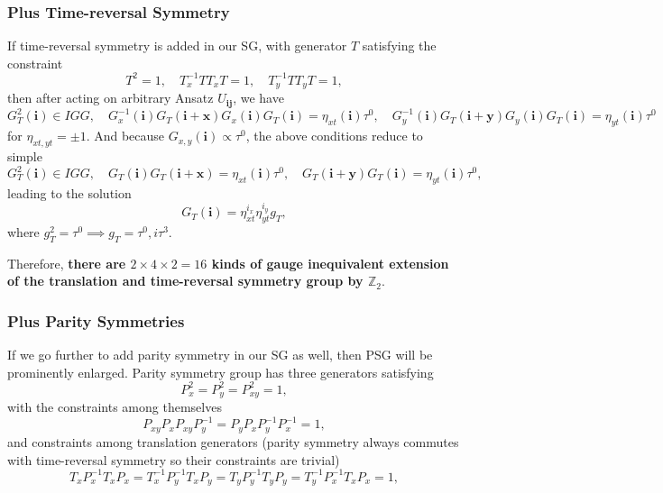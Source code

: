 \documentclass[10pt,nofootinbib]{revtex4}
\begin{document}
	\subsubsection{Plus Time-reversal Symmetry}
		If time-reversal symmetry is added in our SG, with generator $T$ satisfying the constraint
		\begin{equation}\label{3.2.1}
			T^2=1,\quad T_x^{-1}TT_xT=1,\quad T_y^{-1}TT_yT=1,
		\end{equation}
		then after acting on arbitrary Ansatz $U_{\bm{ij}}$, we have
		\begin{equation}\label{3.2.2}
			G_T^2(\bm{i})\in IGG,\quad G_{x}^{-1}(\bm{i})G_T(\bm{i+x})G_x(\bm{i})G_T(\bm{i})=\eta_{xt}(\bm{i})\tau^0,\quad G_{y}^{-1}(\bm{i})G_T(\bm{i+y})G_y(\bm{i})G_T(\bm{i})=\eta_{yt}(\bm{i})\tau^0
		\end{equation}
		for $\eta_{xt,yt}=\pm1$.
		And because $G_{x,y}(\bm{i})\propto\tau^0$, the above conditions reduce to simple
		\begin{equation}\label{3.2.3}
			G_T^2(\bm{i})\in IGG,\quad G_T(\bm{i})G_T(\bm{i+x})=\eta_{xt}(\bm{i})\tau^0,\quad G_T(\bm{i+y})G_T(\bm{i})=\eta_{yt}(\bm{i})\tau^0,
		\end{equation}
		leading to the solution
		\begin{equation}\label{3.2.4}
			G_T(\bm{i})=\eta_{xt}^{i_x}\eta_{yt}^{i_y}g_T,
		\end{equation}
		where $g_T^2=\tau^0\implies g_T=\tau^0,i\tau^3$.\par
		Therefore, \textbf{there are $2\times 4\times 2=16$ kinds of gauge inequivalent extension of the translation and time-reversal symmetry group by $\mathbb{Z}_2$}.

	\subsubsection{Plus Parity Symmetries}
		If we go further to add parity symmetry in our SG as well, then PSG will be prominently enlarged. Parity symmetry group has three generators satisfying
		\begin{equation*}
			P_x^2=P_y^2=P_{xy}^2=1,
		\end{equation*}
		with the constraints among themselves
		\begin{equation}\label{3.3.1}
			P_{xy}P_xP_{xy}P_y^{-1}=P_yP_xP_y^{-1}P_x^{-1}=1,
		\end{equation}
		and constraints among translation generators (parity symmetry always commutes with time-reversal symmetry so their constraints are trivial)
		\begin{equation}\label{3.3.1}
			T_xP_x^{-1}T_xP_x=T_x^{-1}P_y^{-1}T_xP_y=T_yP_y^{-1}T_yP_y=T_y^{-1}P_x^{-1}T_xP_x=1,
		\end{equation}
\end{document}
